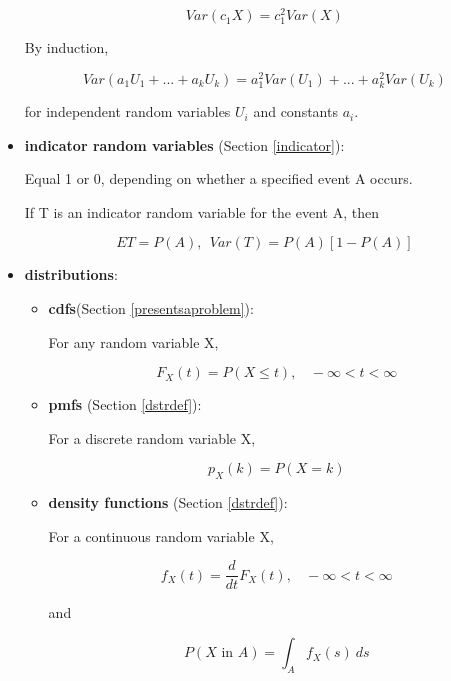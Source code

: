 \begin{itemize}
\begin{equation}
Var(c_1 X) = c^2_1 Var(X)
\end{equation}

By induction,

\begin{equation}
Var(a_1 U_1 + ... + a_k U_k) = a^2_1 Var(U_1) + ... + a^2_k Var(U_k)
\end{equation}

for independent random variables $U_i$ and constants $a_i$.

\item {\bf indicator random variables} (Section \ref{indicator}):

Equal 1 or 0, depending on whether a specified event A occurs.

If T is an indicator random variable for the event A, then

\begin{equation}
ET = P(A), ~~ Var(T) = P(A) [1-P(A)]
\end{equation}

\item {\bf distributions}:

   \begin{itemize}

   \item {\bf cdfs}(Section \ref{presentsaproblem}):

   For any random variable X,

   \begin{equation}
   F_X(t) = P(X \leq t),  ~~~~ -\infty < t < \infty
   \end{equation}

   \item {\bf pmfs} (Section \ref{dstrdef}): 

   For a discrete random variable X,

   \begin{equation}
   p_X(k) = P(X = k)
   \end{equation}

   \item {\bf density functions} (Section \ref{dstrdef}): 

   For a continuous random variable X,

   \begin{equation}
   f_X(t) = \frac{d}{dt} F_X(t), ~~~~ -\infty < t < \infty
   \end{equation}

   and

   \begin{equation}
   P(X \textrm{ in } A) = \int_A f_X(s) ~ ds
   \end{equation}


\end{itemize}
\end{itemize}
